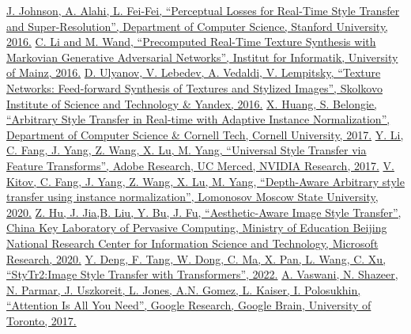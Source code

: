 \documentclass{article}
\begin{document}
\begin{thebibliography}{9}
    \href{https://arxiv.org/pdf/1603.08155}{J. Johnson, A. Alahi, L. Fei-Fei, “Perceptual Losses for Real-Time Style Transfer and Super-Resolution”, Department of Computer Science, Stanford University, 2016.}
    \href{https://arxiv.org/pdf/1604.04382}{C. Li and M. Wand, “Precomputed Real-Time Texture Synthesis with Markovian Generative Adversarial Networks”, Institut for Informatik, University of Mainz, 2016.}
    \href{https://arxiv.org/pdf/1603.03417}{D. Ulyanov, V. Lebedev, A. Vedaldi, V. Lempitsky, “Texture Networks: Feed-forward Synthesis of Textures and Stylized Images”, Skolkovo Institute of Science and Technology \& Yandex, 2016.}
    \href{https://arxiv.org/pdf/1703.06868}{X. Huang, S. Belongie, “Arbitrary Style Transfer in Real-time with Adaptive Instance Normalization”, Department of Computer Science \& Cornell Tech, Cornell University, 2017.}
    \href{https://arxiv.org/pdf/1705.08086}{Y. Li, C. Fang, J. Yang, Z. Wang, X. Lu, M. Yang, “Universal Style Transfer via Feature Transforms”, Adobe Research, UC Merced, NVIDIA Research, 2017.}
    \href{https://arxiv.org/pdf/1705.08086}{V. Kitov, C. Fang, J. Yang, Z. Wang, X. Lu, M. Yang, “Depth-Aware Arbitrary style transfer using instance normalization”, Lomonosov Moscow State University, 2020.}
    \href{https://hcsi.cs.tsinghua.edu.cn/Paper/Paper20/MM20-HUZHIYUAN.pdf}{Z. Hu, J. Jia,B. Liu, Y. Bu, J. Fu, “Aesthetic-Aware Image Style Transfer”, China Key Laboratory of Pervasive Computing, Ministry of Education Beijing National Research Center for Information Science and Technology, Microsoft Research, 2020.}
    \href{https://arxiv.org/pdf/2105.14576}{Y. Deng, F. Tang, W. Dong, C. Ma, X. Pan, L. Wang, C. Xu, “StyTr2:Image Style Transfer with Transformers”, 2022.}
   \href{https://arxiv.org/pdf/2105.14576}{A. Vaswani, N. Shazeer, N. Parmar, J. Uszkoreit, L. Jones, A.N. Gomez, L. Kaiser, I. Polosukhin, “Attention Is All You Need”, Google Research, Google Brain, University of Toronto, 2017.}
\end{thebibliography}
\end{document}
